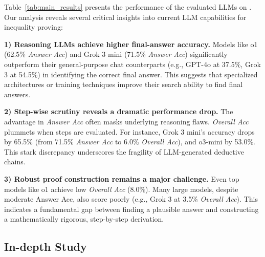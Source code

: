 

Table~\ref{tab:main_results} presents the performance of the evaluated LLMs on \dataset. Our analysis reveals several critical insights into current LLM capabilities for inequality proving:
\vspace{-0.5mm}

\textbf{1) Reasoning LLMs achieve higher final-answer accuracy.} Models like o1 (62.5\% \textit{Answer Acc}) and Grok 3 mini (71.5\% \textit{Answer Acc}) significantly outperform their general-purpose chat counterparts (e.g., GPT-4o at 37.5\%, Grok 3 at 54.5\%) in identifying the correct final answer. This suggests that specialized architectures or training techniques improve their search ability to find final answers.

\vspace{-0.5mm}
\textbf{2) Step-wise scrutiny reveals a dramatic performance drop.} 
The advantage in \textit{Answer Acc} often masks underlying reasoning flaws. \textit{Overall Acc} plummets when steps are evaluated. For instance, Grok 3 mini's accuracy drops by 65.5\% (from 71.5\% \textit{Answer Acc} to 6.0\% \textit{Overall Acc}), and o3-mini by 53.0\%. This stark discrepancy underscores the fragility of LLM-generated deductive chains. 

\vspace{-0.5mm}
\textbf{3) Robust proof construction remains a major challenge.} Even top models like o1 achieve low \textit{Overall Acc} (8.0\%). Many large models, despite moderate Answer Acc, also score poorly (e.g., Grok 3 at 3.5\% \textit{Overall Acc}). This indicates a fundamental gap between finding a plausible answer and constructing a mathematically rigorous, step-by-step derivation.

\vspace{-3mm}
\subsection{In-depth Study}
\label{sec:in_depth_study}
\vspace{-2mm}

\vspace{-1mm}
